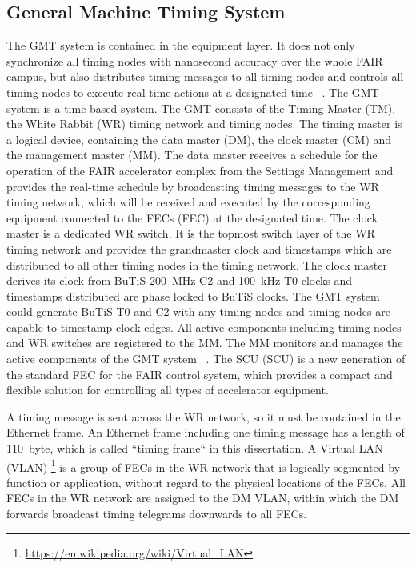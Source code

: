 \subsection{General Machine Timing System}
The GMT system is contained in the equipment layer. It does not only synchronize all timing nodes with nanosecond accuracy over the whole FAIR campus, but also distributes timing messages to all timing nodes and controls all timing nodes to execute real-time actions at a designated time ~\cite{beck_new_2012}. The GMT system is a time based system. The GMT consists of the Timing Master (\gls{TM}), the White Rabbit (WR) timing network and timing nodes. The timing master is a logical device, containing the data master (\gls{DM}), the clock master (\gls{CM}) and the management master (\gls{MM}). The data master receives a schedule for the operation of the FAIR accelerator complex from the Settings Management and provides the real-time schedule by broadcasting timing messages to the WR timing network, which will be received and executed by the corresponding equipment connected to the \gls{FEC}s (FEC) at the designated time. The clock master is a dedicated WR switch. It is the topmost switch layer of the WR timing network and provides the grandmaster clock and timestamps which are distributed to all other timing nodes in the timing network. The clock master derives its clock from BuTiS \SI{200}{MHz} C2 and \SI{100}{kHz} T0 clocks and timestamps distributed are phase locked to BuTiS clocks. The GMT system could generate BuTiS T0 and C2 with any timing nodes and timing nodes are capable to timestamp clock edges. All active components including timing nodes and WR switches are registered to the MM. The MM monitors and manages the active components of the GMT system ~\cite{beck_general_????, beck_timing_2015}. The \gls{SCU} (SCU) is a new generation of the standard FEC for the FAIR control system, which provides a compact and flexible solution for controlling all types of accelerator equipment.

A timing message is sent across the WR network, so it must be contained in the Ethernet frame. An Ethernet frame including one timing message has a length of \SI{110}{byte}, which is called ``timing frame`` in this dissertation. A Virtual LAN (VLAN) \footnote{\url{https://en.wikipedia.org/wiki/Virtual_LAN}} is a group of FECs in the WR network that is logically segmented by function or application, without regard to the physical locations of the FECs. All FECs in the WR network are assigned to the DM VLAN, within which the DM forwards broadcast timing telegrams downwards to all FECs. 

